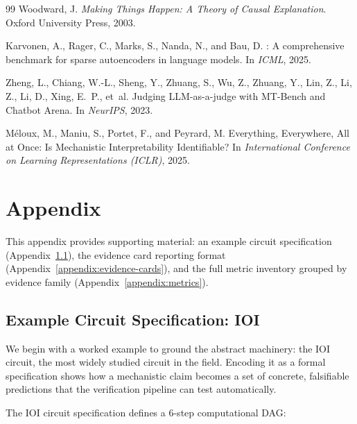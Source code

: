 \documentclass[10pt]{article}
\begin{document}
\begin{thebibliography}{99}
Woodward, J.
\newblock \emph{Making Things Happen: A Theory of Causal Explanation}.
\newblock Oxford University Press, 2003.

Karvonen, A., Rager, C., Marks, S., Nanda, N., and Bau, D.
: A comprehensive benchmark for sparse autoencoders in language models.
\newblock In \emph{ICML}, 2025.

Zheng, L., Chiang, W.-L., Sheng, Y., Zhuang, S., Wu, Z., Zhuang, Y., Lin, Z., Li, Z., Li, D., Xing, E.~P., et~al.
\newblock Judging {LLM}-as-a-judge with {MT}-Bench and Chatbot Arena.
\newblock In \emph{NeurIPS}, 2023.

M\'eloux, M., Maniu, S., Portet, F., and Peyrard, M.
\newblock Everything, Everywhere, All at Once: Is Mechanistic Interpretability Identifiable?
\newblock In \emph{International Conference on Learning Representations (ICLR)}, 2025.


\end{thebibliography}

\appendix
\section{Appendix}

This appendix provides supporting material: an example circuit specification
(Appendix~\ref{appendix:ioi-detail}), the evidence card reporting format
(Appendix~\ref{appendix:evidence-cards}), and the full metric inventory grouped by
evidence family (Appendix~\ref{appendix:metrics}).

\subsection{Example Circuit Specification: IOI}

\label{appendix:ioi-detail}

We begin with a worked example to ground the abstract machinery: the IOI circuit,
the most widely studied circuit in the field.
Encoding it as a formal specification  shows how a mechanistic claim becomes a set of concrete, falsifiable predictions that the verification pipeline can test automatically.

The IOI circuit specification defines a 6-step computational DAG:
\end{document}
